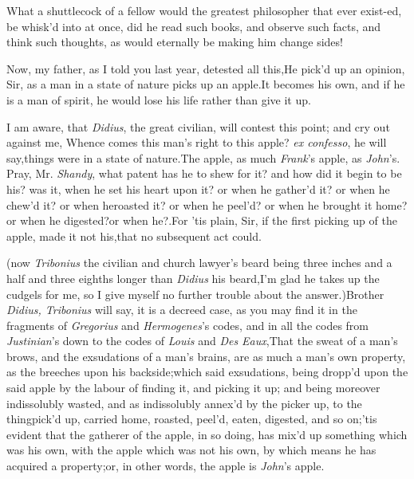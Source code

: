 \documentclass{article}
\begin{document}
What a shuttlecock of a fellow would the greatest philosopher
that ever exist-\break ed, be whisk’d into at once, did he read
such books, and observe such facts, and think such thoughts, as
would eternally be making him change sides!

Now, my father, as I told you last year, detested all
this,\tsk He pick’d up an opinion, Sir, as a man in a state
of nature picks up an apple.\tsk It becomes his own,\tsk\break
and if he is a man of spirit, he would lose his life rather than
give it up.\tsh

I am aware, that \textit{Didius}, the great civilian, will contest
this point; and cry out against me, Whence comes this man’s
right to this apple? \textit{ex confesso}, he will say,\tsh things
were in a state of nature.\break\tsk The apple, as much
\textit{Frank}’s apple, as \textit{John}’s. Pray, Mr.
\textit{Shandy}, what patent has he to shew for it? and how did it
begin to be his? was it, when he set
his heart upon it? or when he gather’d it? or when he chew’d it?
or when he\break roasted it? or when he peel’d? or when he brought it
home? or when he digest\-ed?\tsh or when he\tsh\tsk ?\tsh.\break For ’tis
plain, Sir, if the first picking up of the apple, made it not
his,\tsh that no\break
subsequent act could.

\break
(now \textit{Tribonius} the civilian and church lawyer’s beard being
three inches and a half and three eighths longer than \textit{Didius}
his beard,\tsk I’m glad he takes up the cudgels for me, so I
give myself no further trouble about the answer.)\tsk Brother
\textit{Didius, Tribonius} will say, it is a decreed case, as you may
find it in the fragments of \textit{Gregorius} and
\textit{Hermogenes}’s codes, and in all the codes from
\textit{Justinian}’s down to the codes of \textit{Louis} and
\textit{Des Eaux},\tsk That the sweat of a man’s brows, and
the exsudations of a man’s brains, are as much a man’s
own property, as the breeches upon his backside;\tsk which said
exsudations, \etc\@ being dropp’d upon the said apple by the
labour of finding it, and picking it up; and being moreover
indissolubly wasted, and as indissolubly annex’d by the
picker up, to the thing\break pick’d up, carried home, roasted,
peel’d, eaten, digested, and so on;\tsh ’tis
evi\-dent that the gatherer of the apple, in so doing, has
mix’d up something which was his own, with the apple which
was not his own, by which means he has acquired a
property;\tsk or, in other words, the apple is
\textit{John}’s apple.
\end{document}
